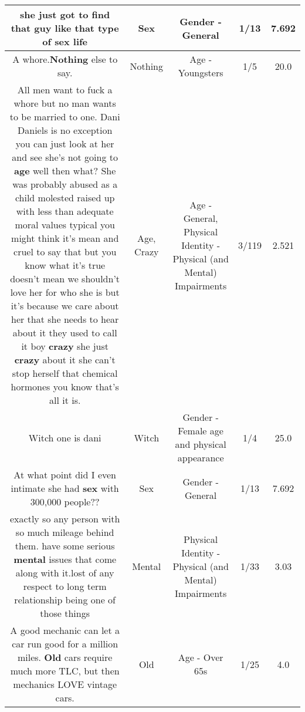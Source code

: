 \documentclass[11pt]{article}
\newlength\mylength
\begin{document}
\begin{center}
\begin{longtable}{|C{.65\mylength}|C{.30\mylength}|C{.12\mylength}|C{.12\mylength}|C{.12\mylength}|}
  \small she just got to find that guy like that type of \textbf{sex} life\normalsize   & Sex & Gender - General & 1/13 & 7.692 \\  \hline
  \small A whore.\textbf{Nothing} else to say.\normalsize   & Nothing & Age - Youngsters & 1/5 & 20.0 \\  \hline
  \small All men want to fuck a whore but no man wants to be married to one. Dani Daniels is no exception you can just look at her and see she's not going to \textbf{age} well then what? She was probably abused as a child molested raised up with less than adequate moral values typical you might think it's mean and cruel to say that but you know what it's true doesn't mean we shouldn't love her for who she is but it's because we care about her that she needs to hear about it they used to call it boy \textbf{crazy} she just \textbf{crazy} about it she can't stop herself that chemical hormones you know that's all it is.\normalsize   & Age, Crazy & Age - General, Physical Identity - Physical (and Mental) Impairments & 3/119 & 2.521 \\  \hline
  \small Witch one is dani\normalsize   & Witch & Gender - Female age and physical appearance & 1/4 & 25.0 \\  \hline
  \small At what point did I even intimate she had \textbf{sex} with 300,000 people??\normalsize   & Sex & Gender - General & 1/13 & 7.692 \\  \hline
  \small exactly so any person with so much mileage behind them. have some serious \textbf{mental} issues that come along with it.lost of any respect to long term relationship being one of those things\normalsize   & Mental & Physical Identity - Physical (and Mental) Impairments & 1/33 & 3.03 \\  \hline
  \small A good mechanic can let a car run good for a million miles.  \textbf{Old} cars require much more TLC, but then mechanics LOVE vintage cars.\normalsize   & Old & Age - Over 65s & 1/25 & 4.0 \\  \hline

\end{longtable}
\end{center}
\end{document}
